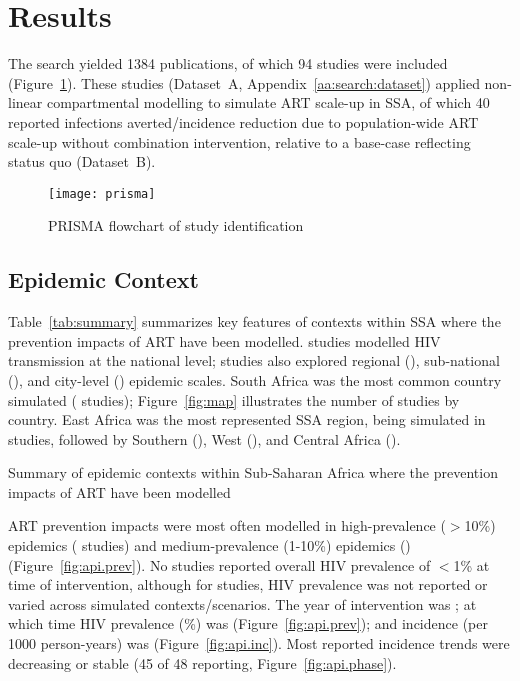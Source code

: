 \section{Results}
\label{s:res}
The search yielded 1384 publications,
of which 94 studies were included (Figure~\ref{fig:prisma}).
These studies (Dataset~A, Appendix~\ref{aa:search:dataset})
applied non-linear compartmental modelling to simulate ART scale-up in SSA,
of which 40 reported infections averted/incidence reduction
due to population-wide ART scale-up without combination intervention,
relative to a base-case reflecting status quo (Dataset~B).
\begin{figure}
  \centering
  \texttt{[image: prisma]}
  \caption{PRISMA flowchart of study identification}
  \label{fig:prisma}
\end{figure}
\subsection{Epidemic Context}
\label{ss:res:context}
Table~\ref{tab:summary} summarizes key features of contexts within SSA
where the prevention impacts of ART have been modelled.
 studies modelled HIV transmission at the national level;
studies also explored
regional (),
sub-national (), and
city-level () epidemic scales.
South Africa was the most common country simulated ( studies);
Figure~\ref{fig:map} illustrates the number of studies by country.
East Africa was the most represented SSA region, being simulated in  studies,
followed by Southern (), West (), and Central Africa ().
\begin{table}
  \centering
  \caption{Summary of epidemic contexts within Sub-Saharan Africa where
    the prevention impacts of ART have been modelled}
  \label{tab:summary}
  
\end{table}
\par
ART prevention impacts were most often modelled in
high-prevalence ({$>$10\%}) epidemics ( studies) and
medium-prevalence ({1-10\%}) epidemics () (Figure~\ref{fig:api.prev}).
No studies reported overall HIV prevalence of {$<$1\%} at time of intervention,
although for  studies, HIV prevalence was
not reported or varied across simulated contexts/scenarios.
The \xdmdef year of intervention was ; at which time
HIV prevalence (\%) was  (Figure~\ref{fig:api.prev}); and
incidence (per 1000 person-years) was  (Figure~\ref{fig:api.inc}).
Most reported incidence trends were decreasing or stable
(45 of 48 reporting, Figure~\ref{fig:api.phase}). %
